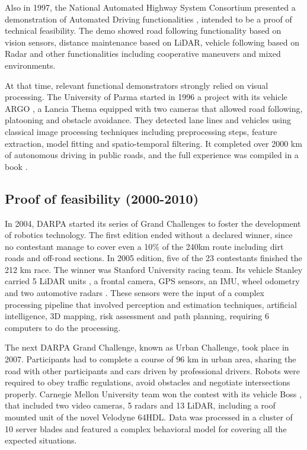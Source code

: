 Also in 1997, the National Automated Highway System Consortium presented a 
demonstration of Automated Driving functionalities \cite{Thorpe1997}, intended 
to be a proof of technical feasibility. 
The demo showed road following functionality based on vision sensors, distance 
maintenance based on LiDAR, vehicle following based on Radar and other 
functionalities including cooperative maneuvers and mixed environments.

At that time, relevant functional demonstrators strongly relied on visual 
processing. The University of Parma started in 1996 a project with its vehicle 
ARGO \cite{Broggi1998}, a Lancia Thema equipped with two cameras that allowed 
road following, platooning and obstacle avoidance. They detected lane lines and 
vehicles using classical image processing techniques including preprocessing 
steps, feature extraction, model fitting and spatio-temporal filtering.
It completed over 2000 km of autonomous driving in public roads, and the full 
experience was compiled in a book \cite{Broggi1999}.

\subsection{Proof of feasibility (2000-2010)}

In 2004, DARPA started its series of Grand Challenges to foster the development
of robotics technology. 
The first edition ended without a declared winner, since no contestant manage to
cover even a 10\% of the 240km route including dirt roads and off-road sections.
In 2005 edition, five of the 23 contestants finished the 212 km race. 
The winner was Stanford University racing team. Its vehicle Stanley carried 5 
LiDAR units 
, a frontal camera, GPS sensors, an IMU, wheel odometry and two 
automotive radars \cite{Thrun2006}. These sensors were the input of a 
complex processing pipeline that involved perception and estimation techniques, 
artificial intelligence, 3D mapping, risk assessment and path planning, 
requiring 6 computers to do the processing. 

The next DARPA Grand Challenge, known as Urban Challenge, took place in 2007. 
Participants had to complete a course of 96 km in urban area, sharing the road 
with other participants and cars driven by professional drivers. Robots were 
required to obey traffic regulations, avoid obstacles and negotiate 
intersections properly. Carnegie Mellon University team won the contest with 
its vehicle Boss \cite{TartanRacing2005}, that included two video cameras, 5 
radars and 13 LiDAR, including a roof mounted unit of the novel Velodyne 64HDL. 
Data was processed in a cluster of 10 server blades and featured a complex 
behavioral model \cite{Urmson2007} for covering all the expected situations.

